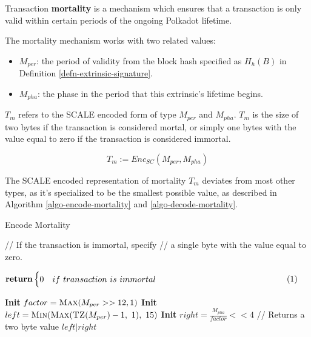 \begin{definition}
    \label{defn-extrinsic-mortality}
    Transaction \textbf{mortality} is a mechanism which ensures that a
    transaction is only valid within certain periods of the ongoing Polkadot
    lifetime.
    \newline

    The mortality mechanism works with two related values:

    \begin{itemize}
        \item $M_{per}$: the period of validity from the block hash specified as
        $H_h(B)$ in Definition \ref{defn-extrinsic-signature}.
        \item $M_{pha}$: the phase in the period that this extrinsic's lifetime
        begins.
    \end{itemize}


    $T_m$ refers to the SCALE encoded form of type $M_{per}$ and $M_{pha}$.
    $T_m$ is the size of two bytes if the transaction is considered mortal,
    or simply one bytes with the value equal to zero if the transaction is
    considered immortal.

    \[
        T_m := Enc_{SC}(M_{per}, M_{pha})
    \]

    The SCALE encoded representation of mortality $T_m$ deviates from most
    other types, as it's specialized to be the smallest possible value, as
    described in Algorithm \ref{algo-encode-mortality} and
    \ref{algo-decode-mortality}.

    \begin{algorithm}[H]
        \caption[]{\sc Encode Mortality}
        \label{algo-encode-mortality}
        \begin{algorithmic}[1]
            \Statex // If the transaction is immortal, specify
            \Statex // a single byte with the value equal to zero.
            \State $\vcenter{
                \begin{flalign*}
                    \Return & 
                    \begin{cases}
                    0 & if\ transaction\ is\ immortal 
                    \end{cases}&
                \end{flalign*}
            }$
            \State \textbf{Init} $factor = \textsc{Max}(M_{per} >> 12, 1)$
            \State \textbf{Init} $left = \textsc{Min}(\textsc{Max}(\textsc{TZ}(M_{per})-1,\ 1),\ 15)$
            \State \textbf{Init} $right = \frac{M_{pha}}{factor} << 4$
            \Statex
            \Statex // Returns a two byte value
            \State \Return $left|right$
        \end{algorithmic}
    \end{algorithm}


\end{definition}
